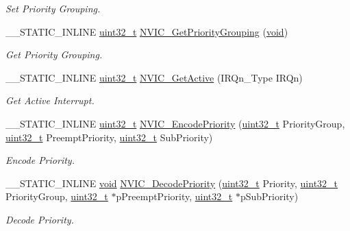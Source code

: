 \begin{DoxyCompactItemize}
\begin{DoxyCompactList}\small\item\em Set Priority Grouping. \end{DoxyCompactList}\item 
\-\_\-\-\_\-\-S\-T\-A\-T\-I\-C\-\_\-\-I\-N\-L\-I\-N\-E \hyperlink{stdint_8h_a435d1572bf3f880d55459d9805097f62}{uint32\-\_\-t} \hyperlink{group___c_m_s_i_s___core___n_v_i_c_functions_ga394f7ce2ca826c0da26284d17ac6524d}{N\-V\-I\-C\-\_\-\-Get\-Priority\-Grouping} (\hyperlink{group___n_a_m_e_ga18028b8badbf1ea7e704ccac3c488e82}{void})
\begin{DoxyCompactList}\small\item\em Get Priority Grouping. \end{DoxyCompactList}\item 
\-\_\-\-\_\-\-S\-T\-A\-T\-I\-C\-\_\-\-I\-N\-L\-I\-N\-E \hyperlink{stdint_8h_a435d1572bf3f880d55459d9805097f62}{uint32\-\_\-t} \hyperlink{group___c_m_s_i_s___core___n_v_i_c_functions_ga47a0f52794068d076c9147aa3cb8d8a6}{N\-V\-I\-C\-\_\-\-Get\-Active} (I\-R\-Qn\-\_\-\-Type I\-R\-Qn)
\begin{DoxyCompactList}\small\item\em Get Active Interrupt. \end{DoxyCompactList}\item 
\-\_\-\-\_\-\-S\-T\-A\-T\-I\-C\-\_\-\-I\-N\-L\-I\-N\-E \hyperlink{stdint_8h_a435d1572bf3f880d55459d9805097f62}{uint32\-\_\-t} \hyperlink{group___c_m_s_i_s___core___n_v_i_c_functions_gadb94ac5d892b376e4f3555ae0418ebac}{N\-V\-I\-C\-\_\-\-Encode\-Priority} (\hyperlink{stdint_8h_a435d1572bf3f880d55459d9805097f62}{uint32\-\_\-t} Priority\-Group, \hyperlink{stdint_8h_a435d1572bf3f880d55459d9805097f62}{uint32\-\_\-t} Preempt\-Priority, \hyperlink{stdint_8h_a435d1572bf3f880d55459d9805097f62}{uint32\-\_\-t} Sub\-Priority)
\begin{DoxyCompactList}\small\item\em Encode Priority. \end{DoxyCompactList}\item 
\-\_\-\-\_\-\-S\-T\-A\-T\-I\-C\-\_\-\-I\-N\-L\-I\-N\-E \hyperlink{group___n_a_m_e_ga18028b8badbf1ea7e704ccac3c488e82}{void} \hyperlink{group___c_m_s_i_s___core___n_v_i_c_functions_ga4f23ef94633f75d3c97670a53949003c}{N\-V\-I\-C\-\_\-\-Decode\-Priority} (\hyperlink{stdint_8h_a435d1572bf3f880d55459d9805097f62}{uint32\-\_\-t} Priority, \hyperlink{stdint_8h_a435d1572bf3f880d55459d9805097f62}{uint32\-\_\-t} Priority\-Group, \hyperlink{stdint_8h_a435d1572bf3f880d55459d9805097f62}{uint32\-\_\-t} $\ast$p\-Preempt\-Priority, \hyperlink{stdint_8h_a435d1572bf3f880d55459d9805097f62}{uint32\-\_\-t} $\ast$p\-Sub\-Priority)
\begin{DoxyCompactList}\small\item\em Decode Priority. \end{DoxyCompactList}\end{DoxyCompactItemize}



